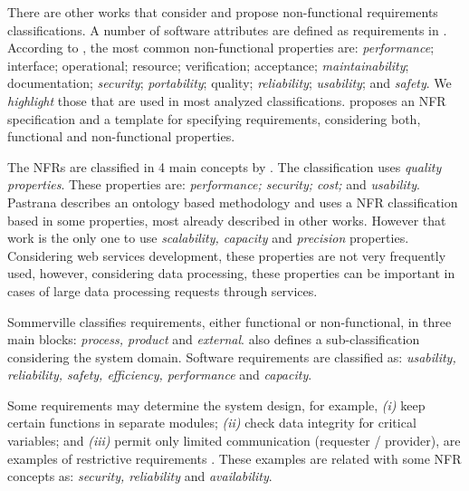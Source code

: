 There are other works
\cite{ieee_1998,CysneirosLN01,Cleland-HuangSZS06,Glinz05rethinkingthe,sommerville08}
that consider and propose non-functional requirements classifications. A number
of software attributes are defined as requirements in
\cite{sommerville08,ieee_1998}. According to \cite{ieee_1998}, the most common
non-functional properties are: \textit{performance}; interface; operational;
resource; verification; acceptance; \textit{maintainability}; documentation;
\textit{security}; \textit{portability}; quality; \textit{reliability};
\textit{usability}; and \textit{safety}. We \textit{highlight} those that are
used in most analyzed classifications. \cite{ieee_1998} proposes an NFR specification
and a template for specifying requirements, considering both, functional and
non-functional properties.

The NFRs are classified in 4 main concepts by \cite{CysneirosLN01}. The
classification uses \textit{quality properties}. These properties are:
\textit{performance; security; cost;} and \textit{usability}. Pastrana
\cite{PastranaPK11} describes an ontology based methodology and uses a NFR
classification based in some properties, most already described in other works.
However that work is the only one to use \textit{scalability, capacity}
and \textit{precision} properties. Considering web services development,
these properties are not very frequently used, however, considering data
processing, these properties can be important in cases of large data processing
requests through services.

Sommerville \cite{sommerville08} classifies requirements,
either functional or non-functional, in three main blocks:
\textit{process, product} and \textit{external}. \cite{sommerville08} 
also defines a sub-classification considering the system domain.
Software requirements are classified as: \textit{usability, reliability, safety,
efficiency, performance} and \textit{capacity}.  
   



Some requirements may determine the system design, for example, \textit{(i)}
keep certain functions in separate modules; \textit{(ii)} check data integrity
for critical variables; and \textit{(iii)} permit only limited communication
(requester / provider), are examples of restrictive requirements
\cite{ieee_1998}. These examples are related with some NFR concepts as: \textit{security, reliability} and
\textit{availability}. 

